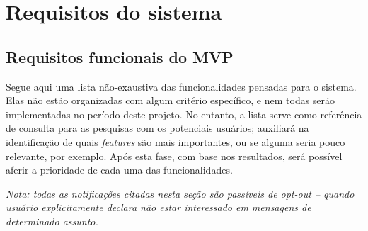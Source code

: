 \documentclass[12pt,a4paper,twoside,hyphens,english,brazil]{abntex2}
\begin{document}
\section{Requisitos do sistema}
\label{sec:requisitos}


\subsection{Requisitos funcionais do MVP}

Segue aqui uma lista não-exaustiva das funcionalidades pensadas para o sistema. Elas não estão organizadas com algum critério específico, e nem todas serão implementadas no período deste projeto. No entanto, a lista serve como referência de consulta para as pesquisas com os potenciais usuários; auxiliará na identificação de quais \emph{features} são mais importantes, ou se alguma seria pouco relevante, por exemplo. Após esta fase, com base nos resultados, será possível aferir a prioridade de cada uma das funcionalidades.

\textit{Nota: todas as notificações citadas nesta seção são passíveis de opt-out -- quando usuário explicitamente declara não estar interessado em mensagens de determinado assunto.}
\end{document}
